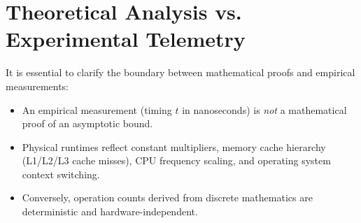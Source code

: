 \section{Theoretical Analysis vs. Experimental Telemetry}
It is essential to clarify the boundary between mathematical proofs and empirical measurements:
\begin{itemize}
    \item An empirical measurement (timing $t$ in nanoseconds) is \emph{not} a mathematical proof of an asymptotic bound.
    \item Physical runtimes reflect constant multipliers, memory cache hierarchy (L1/L2/L3 cache misses), CPU frequency scaling, and operating system context switching.
    \item Conversely, operation counts derived from discrete mathematics are deterministic and hardware-independent.
\end{itemize}
